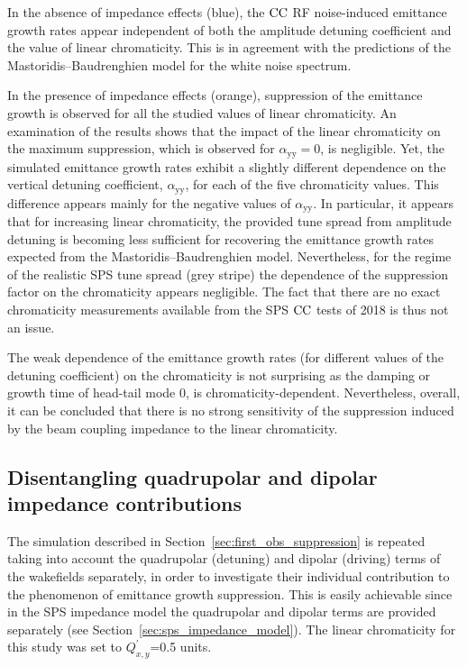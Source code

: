 In the absence of impedance effects (blue), the ${\mathrm{CC}}$ RF noise-induced emittance growth rates appear independent of both the amplitude detuning coefficient and the value of linear chromaticity. This is in agreement with the predictions of the Mastoridis--Baudrenghien model for the white noise spectrum.

In the presence of impedance effects (orange), suppression of the emittance growth is observed for all the studied values of linear chromaticity. An examination of the results shows that the impact of the linear chromaticity on the maximum suppression, which is observed for $\alpha_\mathrm{yy}=0$, is negligible. Yet, the simulated emittance growth rates exhibit a slightly different dependence on the vertical detuning coefficient, $\alpha_\mathrm{yy}$, for each of the five chromaticity values. This difference appears mainly for the negative values of $\alpha_\mathrm{yy}$. In particular, it appears that for increasing linear chromaticity, the provided tune spread from amplitude detuning is becoming less sufficient for recovering the emittance growth rates expected from the Mastoridis--Baudrenghien model. Nevertheless, for the regime of the realistic SPS tune spread (grey stripe) the dependence of the suppression factor on the chromaticity appears negligible. The fact that there are no exact chromaticity measurements available from the SPS ${\mathrm{CC}}$ tests of 2018 is thus not an issue. 


The weak dependence of the emittance growth rates (for different values of the detuning coefficient) on the chromaticity is not surprising as the damping or growth time of head-tail mode 0, is chromaticity-dependent. Nevertheless, overall, it can be concluded that there is no strong sensitivity of the suppression induced by the beam coupling impedance to the linear chromaticity. 

\subsection{Disentangling quadrupolar and dipolar impedance contributions}\label{subsec:quad_vs_dipole}
The simulation described in Section~\ref{sec:first_obs_suppression} is repeated taking into account the quadrupolar (detuning) and dipolar (driving) terms of the wakefields separately, in order to investigate their individual contribution to the phenomenon of emittance growth suppression. This is easily achievable since in the SPS impedance model the quadrupolar and dipolar terms are provided separately (see Section~\ref{sec:sps_impedance_model}).%
The linear chromaticity for this study was set to $Q^\prime_{x,y}$=0.5 units.

